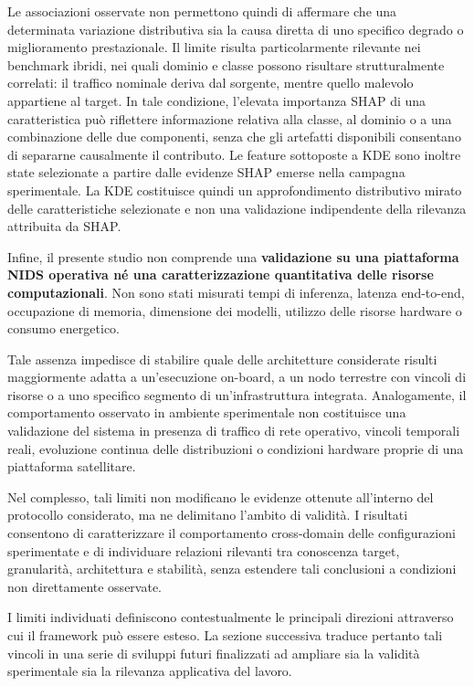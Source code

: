 Le associazioni osservate non permettono quindi di affermare che una determinata variazione distributiva sia la causa diretta di uno specifico degrado o miglioramento prestazionale.
Il limite risulta particolarmente rilevante nei benchmark ibridi, nei quali dominio e classe possono risultare strutturalmente correlati: il traffico nominale deriva dal sorgente, mentre quello malevolo appartiene al target.
In tale condizione, l'elevata importanza SHAP di una caratteristica può riflettere informazione relativa alla classe, al dominio o a una combinazione delle due componenti, senza che gli artefatti disponibili consentano di separarne causalmente il contributo.
Le feature sottoposte a KDE sono inoltre state selezionate a partire dalle evidenze SHAP emerse nella campagna sperimentale. La KDE costituisce quindi un approfondimento distributivo mirato delle caratteristiche selezionate e non una validazione indipendente della rilevanza attribuita da SHAP.

Infine, il presente studio non comprende una \textbf{validazione su una piattaforma NIDS operativa né una caratterizzazione quantitativa delle risorse computazionali}.
Non sono stati misurati tempi di inferenza, latenza end-to-end, occupazione di memoria, dimensione dei modelli, utilizzo delle risorse hardware o consumo energetico.

Tale assenza impedisce di stabilire quale delle architetture considerate risulti maggiormente adatta a un'esecuzione on-board, a un nodo terrestre con vincoli di risorse o a uno specifico segmento di un'infrastruttura integrata.
Analogamente, il comportamento osservato in ambiente sperimentale non costituisce una validazione del sistema in presenza di traffico di rete operativo, vincoli temporali reali, evoluzione continua delle distribuzioni o condizioni hardware proprie di una piattaforma satellitare.

Nel complesso, tali limiti non modificano le evidenze ottenute all'interno del protocollo considerato, ma ne delimitano l'ambito di validità.
I risultati consentono di caratterizzare il comportamento cross-domain delle configurazioni sperimentate e di individuare relazioni rilevanti tra conoscenza target, granularità, architettura e stabilità, senza estendere tali conclusioni a condizioni non direttamente osservate.

I limiti individuati definiscono contestualmente le principali direzioni attraverso cui il framework può essere esteso.
La sezione successiva traduce pertanto tali vincoli in una serie di sviluppi futuri finalizzati ad ampliare sia la validità sperimentale sia la rilevanza applicativa del lavoro.



